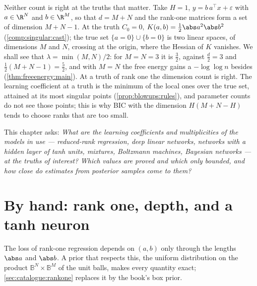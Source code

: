 \begin{refsection}
Neither count is right at the truths that matter. Take $H=1$,  $y=b\,a^\top x+\varepsilon$ with $a\in\R^N$ and $b\in\R^M$, so that $d=M+N$ and the rank-one matrices form a set of dimension $M+N-1$. At the truth $C_0=0$, $K(a,b)=\tfrac12\abs a^2\abs b^2$ (\cref{comp:singular:cast}); the true set $\{a=0\}\cup\{b=0\}$ is two linear spaces, of dimensions $M$ and $N$, crossing at the origin, where the Hessian of $K$ vanishes. We shall see that $\lambda=\min(M,N)/2$: for $M=N=3$ it is $\tfrac32$, against $\tfrac d2=3$ and $\tfrac12(M+N-1)=\tfrac52$, and with $M=N$ the free energy gains a $-\log\log n$ besides (\cref{thm:freeenergy:main}). At a truth of rank one the dimension count is right. The learning coefficient at a truth is the minimum of the local ones over the true set, attained at its most singular points (\cref{prop:blowups:rules}), and parameter counts do not see those points; this is why BIC with the dimension $H(M+N-H)$ tends to choose ranks that are too small.

This chapter asks: \emph{What are the learning coefficients and multiplicities of the models in use --- reduced-rank regression, deep linear networks, networks with a hidden layer of tanh units, mixtures, Boltzmann machines, Bayesian networks --- at the truths of interest? Which values are proved and which only bounded, and how close do estimates from posterior samples come to them?}

\section{By hand: rank one, depth, and a tanh neuron}\label{sec:catalogue:byhand}

The loss of rank-one regression depends on $(a,b)$ only through the lengths $\abs a$ and $\abs b$. A prior that respects this, the uniform distribution on the product $\mathbb B^N\times\mathbb B^M$ of the unit balls, makes every quantity exact; \cref{sec:catalogue:rankone} replaces it by the book's box prior.


\end{refsection}
